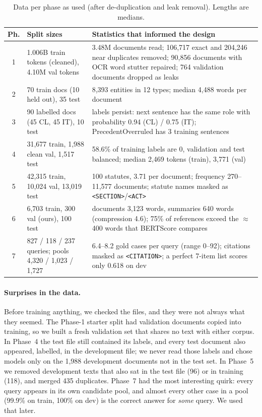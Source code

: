 \documentclass[11pt, oneside]{article}
\newcommand{\code}[1]{\texttt{\small #1}}
\begin{document}
\begin{table}[!t]\centering\footnotesize
\caption{Data per phase as used (after de-duplication and leak removal).  Lengths are medians.}\label{tab:data}
\scriptsize\begin{tabularx}{\linewidth}{clX}\toprule
Ph. & Split sizes & Statistics that informed the design\\\midrule
1 & 1.006B train tokens (cleaned), 4.10M val tokens & 3.48M documents read; 106,717 exact and 204,246 near
duplicates removed; 90,856 documents with OCR word stutter repaired; 764 validation documents dropped as leaks\\
2 & 70 train docs (10 held out), 35 test & 8,393 entities in 12 types; median 4,488 words per document\\
3 & 90 labelled docs (45 CL, 45 IT), 10 test & labels persist: next sentence has the same role with
probability 0.94 (CL) / 0.75 (IT); PrecedentOverruled has 3 training sentences\\
4 & 31,677 train, 1,988 clean val, 1,517 test & 58.6\% of training labels are 0, validation and test balanced;
median 2,469 tokens (train), 3,771 (val)\\
5 & 42,315 train, 10,024 val, 13,019 test & 100 statutes, 3.71 per document; frequency 270--11,577 documents;
statute names masked as \code{<SECTION>}/\code{<ACT>}\\
6 & 6,703 train, 300 val (ours), 100 test & documents 3,123 words, summaries 640 words (compression 4.6);
75\% of references exceed the $\approx$400 words that BERTScore compares\\
7 & 827 / 118 / 237 queries; pools 4,320 / 1,023 / 1,727 & 6.4--8.2 gold cases per query (range 0--92);
citations masked as \code{<CITATION>}; a perfect 7-item list scores only 0.618 on dev\\
\bottomrule\end{tabularx}\end{table}

\paragraph{Surprises in the data.}  Before training anything, we checked the files, and they were not always
what they seemed.  The Phase-1 starter split had validation documents copied into training, so we built a
fresh validation set that shares no text with either corpus.  In Phase~4 the test file still contained its
labels, and every test document also appeared, labelled, in the development file; we never read those labels
and chose models only on the 1,988 development documents not in the test set.  In Phase~5 we removed
development texts that also sat in the test file (96) or in training (118), and merged 435 duplicates.  Phase~7
had the most interesting quirk: every query appears in its own candidate pool, and almost every other case in
a pool (99.9\% on train, 100\% on dev) is the correct answer for \emph{some} query.  We used that later.
\end{document}
